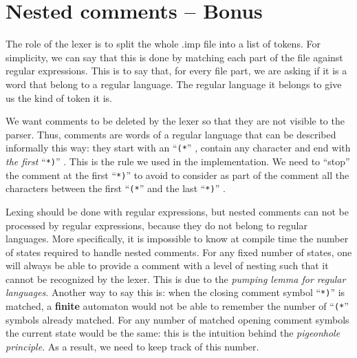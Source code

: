 \documentclass[12pt]{report}
\begin{document}
\chapter{Nested comments -- Bonus}

\newcommand{\stac}{``\texttt{(*}'' }
\newcommand{\stoc}{``\texttt{*)}'' }

The role of the lexer is to split the whole .imp file into a list of tokens.
For simplicity, we can say that this is done by matching each part of the file against regular expressions.
This is to say that, for every file part, we are asking if it is a word that belong to a regular language.
The regular language it belongs to give us the kind of token it is.

We want comments to be deleted by the lexer so that they are not visible to the parser.
Thus, comments are words of a regular language that can be described informally this way: they start with an
\stac, contain any character and end with \emph{the first} \stoc.
This is the rule we used in the implementation.
We need to ``stop'' the comment at the first \stoc to avoid to consider as part of the comment all the characters
between the first \stac and the last \stoc.

Lexing should be done with regular expressions, but nested comments can not be processed by regular expressions, because
they do not belong to regular languages. More specifically, it is impossible to know at compile time the number of states
required to handle nested comments.  For any fixed number of states, one will always be able to provide a comment with a
level of nesting such that it cannot be recognized by the lexer.  This is due to the \textit{pumping lemma for regular
languages}. Another way to say this is: when the closing comment symbol \stoc is matched, a \textbf{finite} automaton would not be able to
remember the number of \stac symbols already matched. For any number of matched opening comment symbols the current state
would be the same: this is the intuition behind the \textit{pigeonhole principle}. As a result, we need to keep track of
this number.
\end{document}
